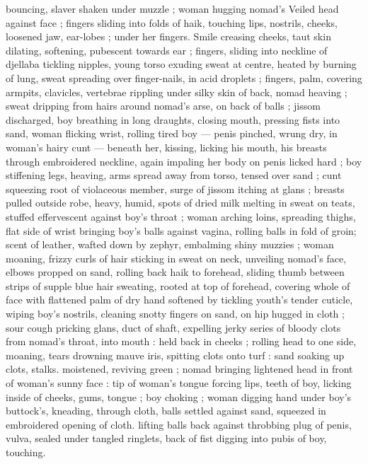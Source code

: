 bouncing, slaver shaken under muzzle ; woman hugging nomad's 
Veiled head against face ; fingers sliding into folds of haik, touching 
lips, nostrils, cheeks, loosened jaw, ear-lobes ; under her fingers. 
Smile creasing cheeks, taut skin dilating, softening, pubescent 
towards ear ; fingers, sliding into neckline of djellaba tickling 
nipples, young torso exuding sweat at centre, heated by burning of 
lung, sweat spreading over finger-nails, in acid droplets ; fingers, 
palm, covering armpits, clavicles, vertebrae rippling under silky skin 
of back, nomad heaving ; sweat dripping from hairs around nomad's 
arse, on back of balls ; jissom discharged, boy breathing in long 
draughts, closing mouth, pressing fists into sand, woman flicking 
wrist, rolling tired boy --- penis pinched, wrung dry, in woman's hairy 
cunt --- beneath her, kissing, licking his mouth, his breasts through 
embroidered neckline, again impaling her body on penis licked hard 
; boy stiffening legs, heaving, arms spread away from torso, tensed 
over sand ; cunt squeezing root of violaceous member, surge of 
jissom itching at glans ; breasts pulled outside robe, heavy, humid, 
spots of dried milk melting in sweat on teats, stuffed effervescent 
against boy's throat ; woman arching loins, spreading thighs, flat 
side of wrist bringing boy's balls against vagina, rolling balls in fold 
of groin; scent of leather, wafted down by zephyr, embalming shiny 
muzzies ; woman moaning, frizzy curls of hair sticking in sweat on 
neck, unveiling nomad's face, elbows propped on sand, rolling back 
haik to forehead, sliding thumb between strips of supple blue hair 
sweating, rooted at top of forehead, covering whole of face with 
flattened palm of dry hand softened by tickling youth's tender 
cuticle, wiping boy's nostrils, cleaning snotty fingers on sand, on hip 
hugged in cloth ; sour cough pricking glans, duct of shaft, expelling 
jerky series of bloody clots from nomad's throat, into mouth : held 
back in cheeks ; rolling head to one side, moaning, tears drowning 
mauve iris, spitting clots onto turf : sand soaking up clots, stalks. 
moistened, reviving green ; nomad bringing lightened head in front 
of woman's sunny face : tip of woman's tongue forcing lips, teeth of 
boy, licking inside of cheeks, gums, tongue ; boy choking ; woman 
digging hand under boy's buttock's, kneading, through cloth, balls 
settled against sand, squeezed in embroidered opening of cloth. 
lifting balls back against throbbing plug of penis, vulva, sealed under 
tangled ringlets, back of fist digging into pubis of boy, touching. 
